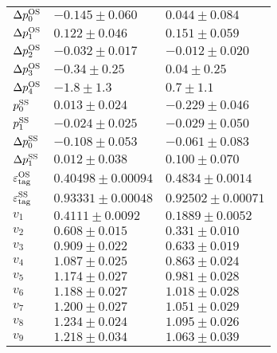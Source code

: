 \begin{table}
\begin{tabular}{lll}
      $\Delta p_{0}^{\rm OS}$      &  $-0.145\pm0.060$      & $0.044\pm0.084$ \\  
      $\Delta p_{1}^{\rm OS}$      &  $0.122\pm0.046$       & $0.151\pm0.059$ \\       
      $\Delta p_{2}^{\rm OS}$      &  $-0.032\pm0.017$      & $-0.012\pm0.020$ \\      
      $\Delta p_{3}^{\rm OS}$      &  $-0.34\pm0.25$        & $0.04\pm0.25$ \\         
      $\Delta p_{4}^{\rm OS}$      &  $-1.8\pm1.3$          & $0.7\pm1.1$ \\  
      \midrule
      $p_{0}^{\rm SS}$             &  $0.013\pm0.024$       & $-0.229\pm0.046$ \\         
      $p_{1}^{\rm SS}$             &  $-0.024\pm0.025$      & $-0.029\pm0.050$ \\      
      $\Delta p_{0}^{\rm SS}$      &  $-0.108\pm0.053$      & $-0.061\pm0.083$ \\      
      $\Delta p_{1}^{\rm SS}$      &  $0.012\pm0.038$       & $0.100\pm0.070$ \\  
      \midrule
      $\varepsilon_{\rm tag}^{\rm OS}$ &  $0.40498\pm0.00094$   & $0.4834\pm0.0014$ \\     
      $\varepsilon_{\rm tag}^{\rm SS}$ &  $0.93331\pm0.00048$   & $0.92502\pm0.00071$ \\ 
      \midrule
      $v_{1}$               &  $0.4111\pm0.0092$     & $0.1889\pm0.0052$ \\     
      $v_{2}$               &  $0.608\pm0.015$       & $0.331\pm0.010$ \\       
      $v_{3}$               &  $0.909\pm0.022$       & $0.633\pm0.019$ \\      
      $v_{4}$               &  $1.087\pm0.025$       & $0.863\pm0.024$ \\      
      $v_{5}$               &  $1.174\pm0.027$       & $0.981\pm0.028$ \\      
      $v_{6}$               &  $1.188\pm0.027$       & $1.018\pm0.028$ \\      
      $v_{7}$               &  $1.200\pm0.027$       & $1.051\pm0.029$ \\      
      $v_{8}$               &  $1.234\pm0.024$       & $1.095\pm0.026$ \\      
      $v_{9}$               &  $1.218\pm0.034$       & $1.063\pm0.039$ \\                  
      \bottomrule
    \end{tabular}
\end{table}
